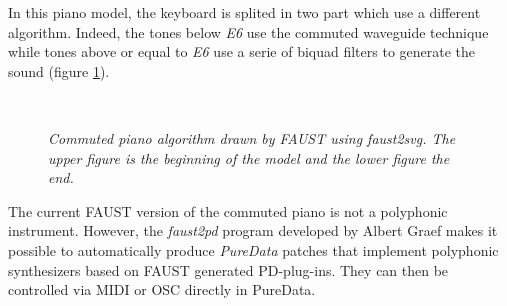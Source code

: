 \documentclass[twoside,a4paper]{article}
\begin{document}
In this piano model, the keyboard is splited in two part which use a
different algorithm. Indeed, the tones
below {\it E6} use the commuted waveguide technique while tones above
or equal to {\it E6} use a serie of biquad filters to generate the
sound (figure \ref{fig:piano}).   

\begin{figure}[ht]
\begin{center}
         \\
        \hspace{2cm}
\caption{{\it Commuted piano algorithm drawn by FAUST using
    faust2svg. The upper figure is the beginning of the model and the
    lower figure the end.}}
\label{fig:piano}
\end{center}
\end{figure}

The current FAUST version of the commuted piano is not a polyphonic
instrument. However, the {\it faust2pd} program developed by Albert
Graef \cite{faust2pd} makes it possible to automatically produce {\it PureData}
patches that implement polyphonic synthesizers based on FAUST generated
PD-plug-ins. They can then be controlled via MIDI or OSC directly in
PureData.    
\end{document}
